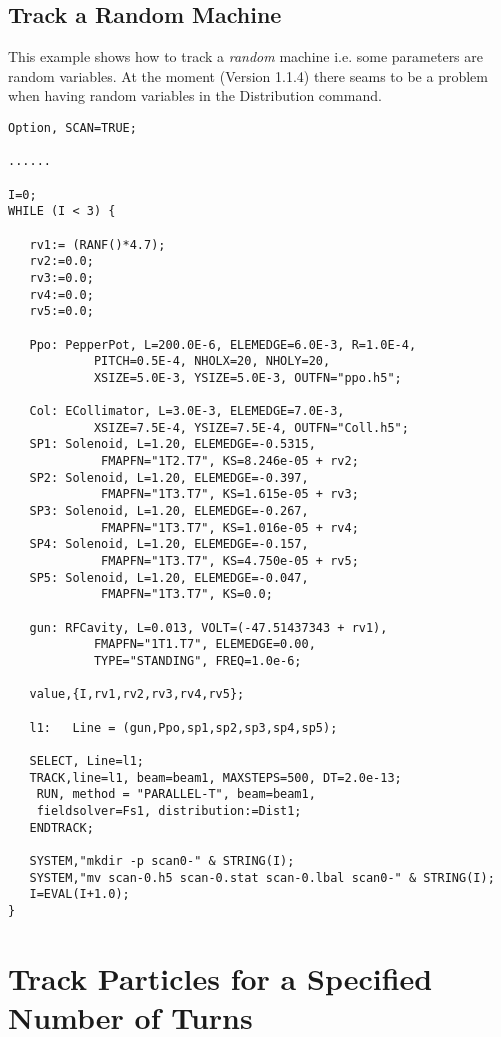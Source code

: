 \subsection{Track a Random Machine} \label{sec:randmach}
This example shows how to track a {\em random} machine i.e. some
parameters are random variables. At the moment (Version 1.1.4) there seams to be a problem when 
having random variables in the Distribution command.
\begin{verbatim}
Option, SCAN=TRUE;

...... 

I=0;
WHILE (I < 3) {

   rv1:= (RANF()*4.7);
   rv2:=0.0; 
   rv3:=0.0; 
   rv4:=0.0; 
   rv5:=0.0; 

   Ppo: PepperPot, L=200.0E-6, ELEMEDGE=6.0E-3, R=1.0E-4, 
            PITCH=0.5E-4, NHOLX=20, NHOLY=20, 
            XSIZE=5.0E-3, YSIZE=5.0E-3, OUTFN="ppo.h5";

   Col: ECollimator, L=3.0E-3, ELEMEDGE=7.0E-3, 
            XSIZE=7.5E-4, YSIZE=7.5E-4, OUTFN="Coll.h5";
   SP1: Solenoid, L=1.20, ELEMEDGE=-0.5315, 
             FMAPFN="1T2.T7", KS=8.246e-05 + rv2;
   SP2: Solenoid, L=1.20, ELEMEDGE=-0.397,  
             FMAPFN="1T3.T7", KS=1.615e-05 + rv3;
   SP3: Solenoid, L=1.20, ELEMEDGE=-0.267,  
             FMAPFN="1T3.T7", KS=1.016e-05 + rv4;
   SP4: Solenoid, L=1.20, ELEMEDGE=-0.157, 
             FMAPFN="1T3.T7", KS=4.750e-05 + rv5;
   SP5: Solenoid, L=1.20, ELEMEDGE=-0.047,  
             FMAPFN="1T3.T7", KS=0.0;

   gun: RFCavity, L=0.013, VOLT=(-47.51437343 + rv1), 
            FMAPFN="1T1.T7", ELEMEDGE=0.00, 
            TYPE="STANDING", FREQ=1.0e-6;

   value,{I,rv1,rv2,rv3,rv4,rv5};

   l1:   Line = (gun,Ppo,sp1,sp2,sp3,sp4,sp5); 

   SELECT, Line=l1;
   TRACK,line=l1, beam=beam1, MAXSTEPS=500, DT=2.0e-13;
    RUN, method = "PARALLEL-T", beam=beam1, 
    fieldsolver=Fs1, distribution:=Dist1;
   ENDTRACK;

   SYSTEM,"mkdir -p scan0-" & STRING(I);
   SYSTEM,"mv scan-0.h5 scan-0.stat scan-0.lbal scan0-" & STRING(I);
   I=EVAL(I+1.0);
}
\end{verbatim}

\section{Track Particles for a Specified Number of Turns}
\label{sec:trackrun}

